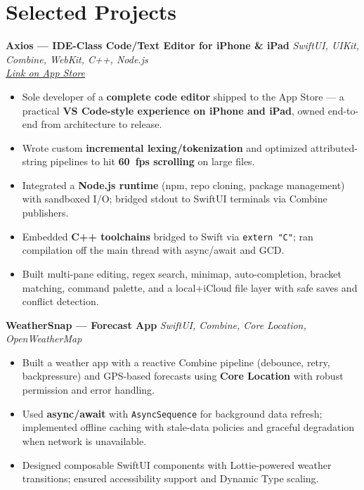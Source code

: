 \documentclass[a4paper,10pt]{article}
\begin{document}
\section*{Selected Projects}
\textbf{Axios --- IDE-Class Code/Text Editor for iPhone \& iPad} \hfill \textit{SwiftUI, UIKit, Combine, WebKit, C++, Node.js}\\
\smallskip
\href{https://apps.apple.com/us/app/axios-code/id6569246357}{\textit{Link on App Store}}
\begin{itemize}
  \item Sole developer of a \textbf{complete code editor} shipped to the App Store --- a practical \textbf{VS Code-style experience on iPhone and iPad}, owned end-to-end from architecture to release.
  \item Wrote custom \textbf{incremental lexing/tokenization} and optimized attributed-string pipelines to hit \textbf{60~fps scrolling} on large files.
  \item Integrated a \textbf{Node.js runtime} (npm, repo cloning, package management) with sandboxed I/O; bridged stdout to SwiftUI terminals via Combine publishers.
  \item Embedded \textbf{C++ toolchains} bridged to Swift via \texttt{extern "C"}; ran compilation off the main thread with async/await and GCD.
  \item Built multi-pane editing, regex search, minimap, auto-completion, bracket matching, command palette, and a local+iCloud file layer with safe saves and conflict detection.
\end{itemize}

\vspace{8pt}

\textbf{WeatherSnap --- Forecast App} \hfill \textit{SwiftUI, Combine, Core Location, OpenWeatherMap}
\begin{itemize}
  \item Built a weather app with a reactive Combine pipeline (debounce, retry, backpressure) and GPS-based forecasts using \textbf{Core Location} with robust permission and error handling.
  \item Used \textbf{async/await} with \texttt{AsyncSequence} for background data refresh; implemented offline caching with stale-data policies and graceful degradation when network is unavailable.
  \item Designed composable SwiftUI components with Lottie-powered weather transitions; ensured accessibility support and Dynamic Type scaling.
\end{itemize}
\end{document}
